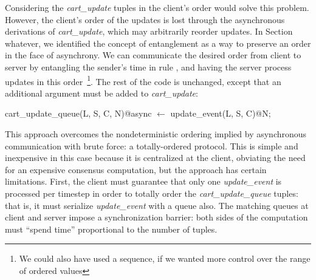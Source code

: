 Considering the {\em cart\_update} tuples in the client's order would solve
this problem.  However, the client's order of the updates is lost through the
asynchronous derivations of {\em cart\_update}, which may arbitrarily reorder
updates.  In Section whatever, we identified the concept of entanglement as a
way to preserve an order in the face of asynchrony.  We can communicate the
desired order from client to server by entangling the sender's time in rule
, and having the server process updates in this order~\footnote{
We could also have used a sequence, if we wanted more control over the range of ordered
values}.
The rest of the code is unchanged, except that an additional argument must be
added to {\em cart\_update}:

\begin{Dedalus}
cart_update_queue(L, S, C, N)@async \(\leftarrow\)
    update_event(L, S, C)@N;
\end{Dedalus}

This approach overcomes the nondeterministic ordering implied by asynchronous
communication with brute force: a totally-ordered protocol. This is simple and
inexpensive in this case because it is centralized at the client, obviating the
need for an expensive consensus computation, but the approach has certain
limitations.  First, the client must guarantee that only one {\em
update\_event} is processed per timestep in order to totally order the {\em
cart\_update\_queue} tuples: that is, it must serialize {\em update\_event}
with a queue also.  The matching queues at client and server impose a
synchronization barrier: both sides of the computation must ``spend time''
proportional to the number of tuples.

